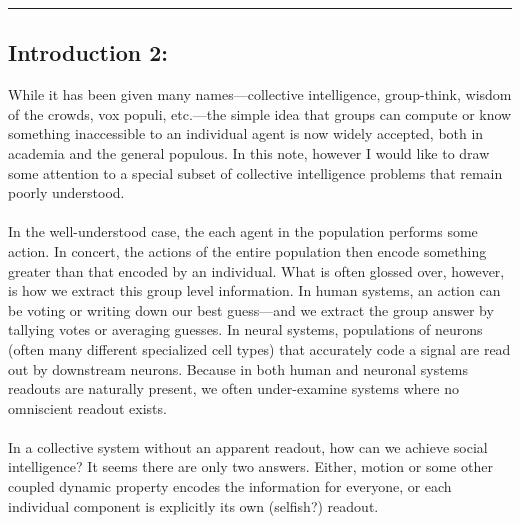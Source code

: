 \documentclass{article}
\begin{document}
%
%
%



\vspace{10pt}
\hrule

\vspace{15pt}


\subsection*{Introduction 2:}
While it has been given many names---collective intelligence, group-think, wisdom of the crowds, vox populi, etc.---the simple idea that groups can compute or know something inaccessible to an individual agent is now widely accepted, both in academia and the general populous.  In this note, however I would like to draw some attention to a special subset of collective intelligence problems that remain poorly understood.\\
\\
In the well-understood case, the each agent in the population performs some action.  In concert, the actions of the entire population then encode something greater than that encoded by an individual.  What is often glossed over, however, is how we extract this group level information.   In human systems, an action can be voting or writing down our best guess---and we extract the group answer by tallying votes or averaging guesses.  In neural systems, populations of neurons (often many different specialized cell types) that accurately code a signal are read out by downstream neurons.  Because in both human and neuronal systems readouts are naturally present, we often under-examine systems where no omniscient readout exists.\\
\\
In a collective system without an apparent readout, how can we achieve social intelligence?  It seems there are only two answers.  Either, motion or some other coupled dynamic property encodes the information for everyone, or each individual component is explicitly its own (selfish?) readout.\\
\\
\end{document}
